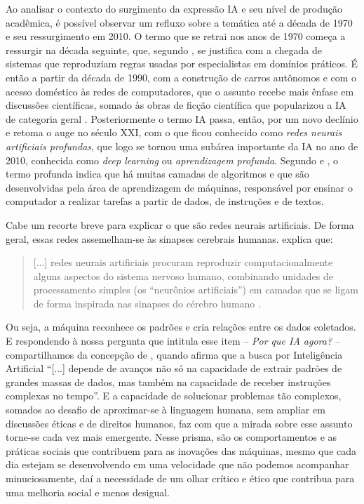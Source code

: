 \documentclass[portuguese]{textolivre}
\begin{document}
Ao analisar o contexto do surgimento da expressão IA e seu nível de produção acadêmica, é possível observar um refluxo sobre a temática até a década de 1970 e seu ressurgimento em 2010. O termo que se retrai nos anos de 1970 começa a ressurgir na década seguinte, que, segundo \textcite{2022kaufman}, se justifica com a chegada de sistemas que reproduziam regras usadas por especialistas em domínios práticos. É então a partir da década de 1990, com a construção de carros autônomos e com o acesso doméstico às redes de computadores, que o assunto recebe mais ênfase em discussões científicas, somado às obras de ficção científica que popularizou a IA de categoria geral \cite{2022kaufman, santaella2023inteligencia}. Posteriormente o termo IA passa, então, por um novo declínio e retoma o auge no século XXI, com o que ficou conhecido como \emph{redes neurais artificiais profundas}, que logo se tornou uma subárea importante da IA no ano de 2010, conhecida como \emph{deep learning} ou \emph{aprendizagem profunda}. Segundo \textcite{2022kaufman} e \textcite{santaella2023inteligencia}, o termo profunda indica que há muitas camadas de algoritmos e que são desenvolvidas pela área de aprendizagem de máquinas, responsável por ensinar o computador a realizar tarefas a partir de dados, de instruções e de textos.

Cabe um recorte breve para explicar o que são redes neurais artificiais. De forma geral, essas redes assemelham-se às sinapses cerebrais humanas. \textcite[p. 6]{2022kaufman} explica que:

\begin{quote}
    [...] redes neurais artificiais procuram reproduzir computacionalmente alguns aspectos do sistema nervoso humano, combinando unidades de processamento simples (os “neurônios artificiais”) em camadas que se ligam de forma inspirada nas sinapses do cérebro humano \cite[p. 6]{2022kaufman}.
\end{quote}

Ou seja, a máquina reconhece os padrões e cria relações entre os dados coletados. E respondendo à nossa pergunta que intitula esse item – \emph{Por que IA agora?} – compartilhamos da concepção de \textcite[p. 6]{2022kaufman}, quando afirma que a busca por Inteligência Artificial “[...] depende de avanços não só na capacidade de extrair padrões de grandes massas de dados, mas também na capacidade de receber instruções complexas no tempo”. E a capacidade de solucionar problemas tão complexos, somados ao desafio de aproximar-se à linguagem humana, sem ampliar em discussões éticas e de direitos humanos, faz com que a mirada sobre esse assunto torne-se cada vez mais emergente. Nesse prisma, são os comportamentos e as práticas sociais que contribuem para as inovações das máquinas, mesmo que cada dia estejam se desenvolvendo em uma velocidade que não podemos acompanhar minuciosamente, daí a necessidade de um olhar crítico e ético que contribua para uma melhoria social e menos desigual. 
\end{document}

